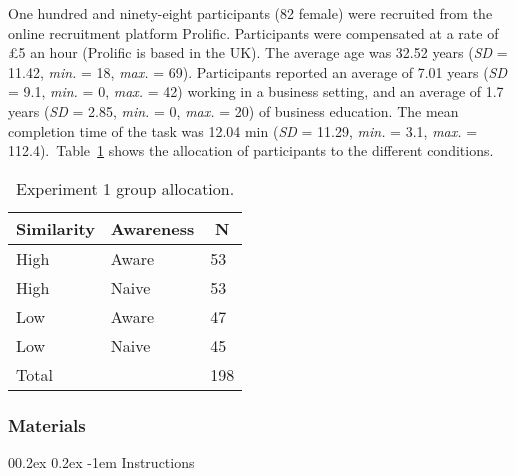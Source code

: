 \documentclass[
  english,
  man, donotrepeattitle,floatsintext]{apa7}
\makeatletter
\let\oldparagraph\paragraph
\renewcommand{\paragraph}[1]{\oldparagraph{#1}\mbox{}}
\renewcommand{\paragraph}{\@startsection{paragraph}{4}{\parindent}%
  {0\baselineskip \@plus 0.2ex \@minus 0.2ex}%
  {-1em}%
  {\normalfont\normalsize\bfseries\itshape\typesectitle}}
\theoremstyle{definition}
\theoremstyle{definition}
\theoremstyle{definition}
\theoremstyle{definition}
\theoremstyle{remark}
\makeatother
\begin{document}
One hundred and ninety-eight participants (82 female) were recruited from the online recruitment platform Prolific. Participants were compensated at a rate of \pounds 5 an hour (Prolific is based in the UK). The average age was 32.52 years (\emph{SD} = 11.42, \emph{min.} = 18, \emph{max.} = 69). Participants reported an average of 7.01 years (\emph{SD} = 9.1, \emph{min.} = 0, \emph{max.} = 42) working in a business setting, and an average of 1.7 years (\emph{SD} = 2.85, \emph{min.} = 0, \emph{max.} = 20) of business education. The mean completion time of the task was 12.04 min (\emph{SD} = 11.29, \emph{min.} = 3.1, \emph{max.} = 112.4).~Table~\ref{tab:condition-allocation-aggregation-1}
shows the allocation of participants to the different conditions.

\begin{table}[tbp]

\begin{center}
\begin{threeparttable}

\caption{\label{tab:condition-allocation-aggregation-1}Experiment 1 group allocation.}

\begin{tabular}{lll}
\toprule
Similarity & \multicolumn{1}{c}{Awareness} & \multicolumn{1}{c}{N}\\
\midrule
High & Aware & 53\\
High & Naive & 53\\
Low & Aware & 47\\
Low & Naive & 45\\
Total &  & 198\\
\bottomrule
\end{tabular}

\end{threeparttable}
\end{center}

\end{table}

\hypertarget{materials}{%
\subsubsection{Materials}\label{materials}}

\hypertarget{instructions-materials-aggregation-1}{%
\paragraph{Instructions}\label{instructions-materials-aggregation-1}}
\end{document}
